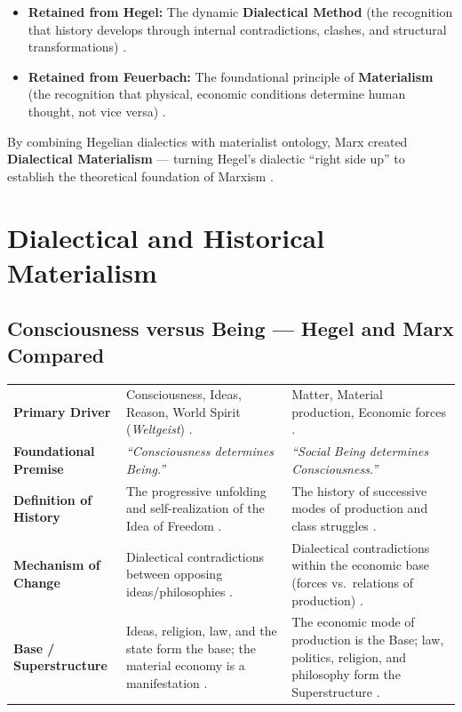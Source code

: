 \begin{itemize}
    \item \textbf{Retained from Hegel:} The dynamic \textbf{Dialectical Method} (the recognition that history develops through internal contradictions, clashes, and structural transformations) .
    \item \textbf{Retained from Feuerbach:} The foundational principle of \textbf{Materialism} (the recognition that physical, economic conditions determine human thought, not vice versa) .
\end{itemize}

\begin{KeyConcept}
By combining Hegelian dialectics with materialist ontology, Marx created \textbf{Dialectical Materialism} --- turning Hegel's dialectic ``right side up'' to establish the theoretical foundation of Marxism .
\end{KeyConcept}

\sectiondivider

\section{Dialectical and Historical Materialism}

\subsection{Consciousness versus Being --- Hegel and Marx Compared}

\begin{table}[htbp]
\centering
\small
\begin{tabularx}{\textwidth}{l Y Y}
\toprule
{}
 &  &  \\
\midrule
\textbf{Primary Driver} & Consciousness, Ideas, Reason, World Spirit (\textit{Weltgeist}) . & Matter, Material production, Economic forces . \\
\textbf{Foundational Premise} & \textit{``Consciousness determines Being.''}  & \textit{``Social Being determines Consciousness.''}  \\
\textbf{Definition of History} & The progressive unfolding and self-realization of the Idea of Freedom . & The history of successive modes of production and class struggles . \\
\textbf{Mechanism of Change} & Dialectical contradictions between opposing ideas/philosophies . & Dialectical contradictions within the economic base (forces vs.\ relations of production) . \\
\textbf{Base / Superstructure} & Ideas, religion, law, and the state form the base; the material economy is a manifestation . & The economic mode of production is the Base; law, politics, religion, and philosophy form the Superstructure . \\
\bottomrule
\end{tabularx}
\end{table}

